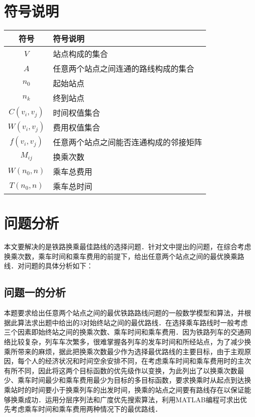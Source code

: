 \documentclass[UTF8]{ctexart}
\begin{document}
\section{符号说明}
\begin{table}[h]
  \centering
  \begin{tabular}{cl}
     \toprule
     符号 & 符号说明 \\
     \midrule
     $V$ & 站点构成的集合 \\
     $A$ & 任意两个站点之间连通的路线构成的集合 \\
     $n_0$ & 起始站点 \\
     $n_k$ & 终到站点 \\
     $C(v_i,v_j)$ & 时间权值集合 \\
     $W(v_i,v_j)$ & 费用权值集合 \\
     $f(v_i,v_j)$ & 任意两个站点之间能否连通构成的邻接矩阵 \\
     $M_{ij}$ & 换乘次数 \\
     $W(n_0,n)$ & 乘车总费用 \\
     $T(n_0,n)$ & 乘车总时间 \\
     \bottomrule
   \end{tabular}
\end{table}

\section{问题分析}
本文要解决的是铁路换乘最佳路线的选择问题．针对文中提出的问题，在综合考虑换乘次数，乘车时间和乘车费用的前提下，给出任意两个站点之间的最优换乘路线．对问题的具体分析如下：

\subsection{问题一的分析}
本题要求给出任意两个站点之间的最优铁路路线问题的一般数学模型和算法，并根据此算法求出题中给出的3对始终站之间的最优路线．在选择乘车路线时一般考虑三个因素即始终站之间的换乘次数、乘车时间和乘车费用．因为铁路列车的交通网络比较复杂，列车车次繁多，很难掌握各列车的发车时间和所经站点，为了减少换乘所带来的麻烦，据此把换乘次数最少作为选择最优路线的主要目标，由于主观原因，每个人的经济状况和时间空余安排不同，在考虑乘车时间和乘车费用时的主次有所不同，因此将这两个目标函数的优先级作以变换，为此列出了以换乘次数最少、乘车时间最少和乘车费用最少为目标的多目标函数，要求换乘时从起点到达换乘站时的时间要小于换乘列车的出发时间，换乘的站点之间要有路线存在以保证能够换乘成功．运用分层序列法和广度优先搜索算法，利用MATLAB编程可求出优先考虑乘车时间和乘车费用两种情况下的最优路线．
\end{document}
